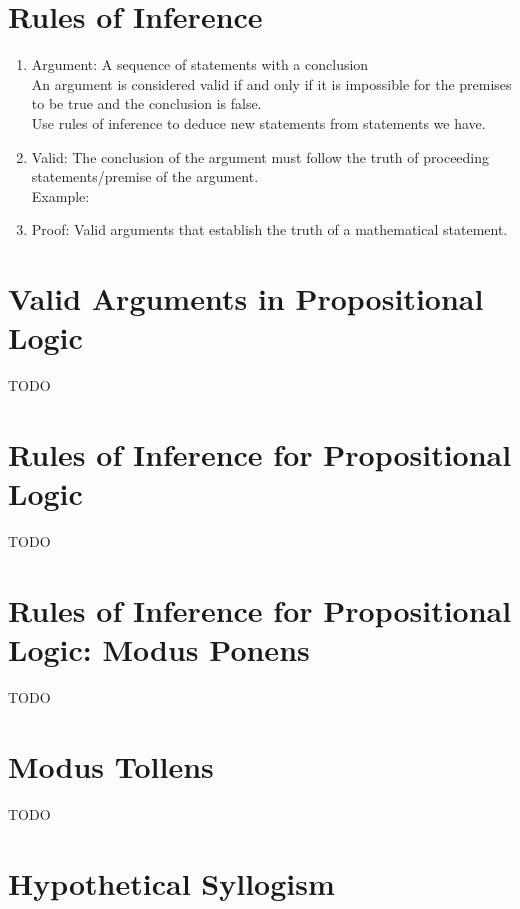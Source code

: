 \documentclass{article}
\begin{document}
\section{Rules of Inference}

\begin{enumerate}
\item
Argument: A sequence of statements with a conclusion\\
An argument is considered valid if and only if it is impossible for the premises to be true and the conclusion is false.\\
Use rules of inference to deduce new statements from statements we have.

\item
Valid: The conclusion of the argument must follow the truth of proceeding statements/premise of the argument.\\
Example:

\item
Proof: Valid arguments that establish the truth of a mathematical statement.
\end{enumerate}


\section{Valid Arguments in Propositional Logic}

TODO

\section{Rules of Inference for Propositional Logic}

TODO

\section{Rules of Inference for Propositional Logic: Modus Ponens}

TODO

\section{Modus Tollens}

TODO

\section{Hypothetical Syllogism}
\end{document}
